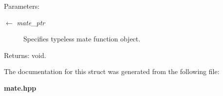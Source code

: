 \begin{Desc}
\item[Parameters:]
\begin{description}
\item[\mbox{$\leftarrow$} {\em mate\_\-ptr}]Specifies typeless mate function object. \end{description}
\end{Desc}
\begin{Desc}
\item[Returns:]void. \end{Desc}


The documentation for this struct was generated from the following file:\begin{CompactItemize}
\item 
{\bf mate.hpp}\end{CompactItemize}
